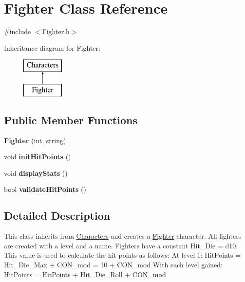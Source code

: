 \hypertarget{class_fighter}{}\section{Fighter Class Reference}
\label{class_fighter}


{\ttfamily \#include $<$Fighter.\+h$>$}

Inheritance diagram for Fighter\+:\begin{figure}[H]
\begin{center}
\leavevmode
\includegraphics[height=2.000000cm]{class_fighter}
\end{center}
\end{figure}
\subsection*{Public Member Functions}
\begin{DoxyCompactItemize}
\item 
\hypertarget{class_fighter_ac50c9ff5d35986be5930dee55a71e909}{}\label{class_fighter_ac50c9ff5d35986be5930dee55a71e909} 
{\bfseries Fighter} (int, string)
\item 
\hypertarget{class_fighter_a5bfd7630b47d4bf3b7b1288195bbad07}{}\label{class_fighter_a5bfd7630b47d4bf3b7b1288195bbad07} 
void {\bfseries init\+Hit\+Points} ()
\item 
\hypertarget{class_fighter_a9e63e29c35aaca0bc60ee46efe00cc62}{}\label{class_fighter_a9e63e29c35aaca0bc60ee46efe00cc62} 
void {\bfseries display\+Stats} ()
\item 
\hypertarget{class_fighter_a235df759d42bb20bd6314abe806dd6ce}{}\label{class_fighter_a235df759d42bb20bd6314abe806dd6ce} 
bool {\bfseries validate\+Hit\+Points} ()
\end{DoxyCompactItemize}


\subsection{Detailed Description}
This class inherits from \hyperlink{class_characters}{Characters} and creates a \hyperlink{class_fighter}{Fighter} character. All fighters are created with a level and a name. Fighters have a constant Hit\+\_\+\+Die = d10. This value is used to calculate the hit points as follows\+: At level 1\+: Hit\+Points = Hit\+\_\+\+Die\+\_\+\+Max + C\+O\+N\+\_\+mod = 10 + C\+O\+N\+\_\+mod With each level gained\+: Hit\+Points = Hit\+Points + Hit\+\_\+\+Die\+\_\+\+Roll + C\+O\+N\+\_\+mod

